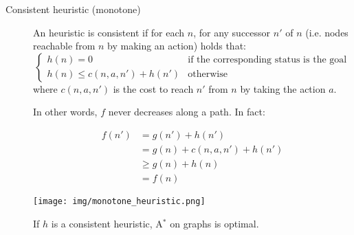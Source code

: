 \begin{description}
    \item[Consistent heuristic (monotone)] 
    An heuristic is consistent if for each $n$, for any successor $n'$ of $n$ (i.e. nodes reachable from $n$ by making an action)
    holds that:
    \[ 
        \begin{cases}
            h(n) = 0 & \text{if the corresponding status is the goal} \\
            h(n) \leq c(n, a, n') + h(n') & \text{otherwise}
        \end{cases}
    \]
    where $c(n, a, n')$ is the cost to reach $n'$ from $n$ by taking the action $a$.

    In other words, $f$ never decreases along a path.
    In fact:\\
    \begin{minipage}{.48\linewidth}
        \[  
            \begin{split}
                f(n') &= g(n') + h(n') \\
                    &= g(n) + c(n, a, n') + h(n') \\
                    &\geq g(n) + h(n) \\
                    &= f(n)
            \end{split}
        \]
    \end{minipage}
    \begin{minipage}{.48\linewidth}
        \centering
        \texttt{[image: img/monotone\_heuristic.png]}
    \end{minipage}


    \begin{theorem}
        If $h$ is a consistent heuristic, A$^*$ on graphs is optimal.
    \end{theorem}
\end{description}
